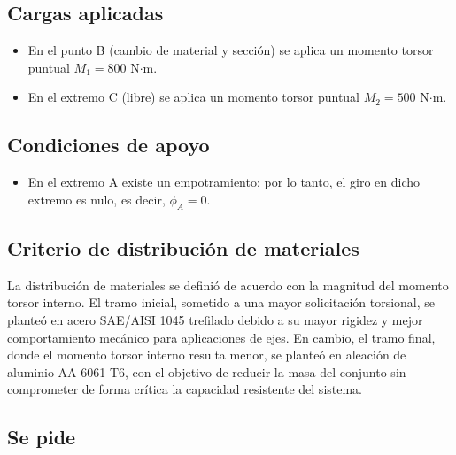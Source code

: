 \documentclass[12pt,a4paper]{article}
\begin{document}
\subsection*{Cargas aplicadas}

\begin{itemize}
    \item En el punto B (cambio de material y sección) se aplica un momento torsor puntual $M_1 = 800$ N$\cdot$m.
    \item En el extremo C (libre) se aplica un momento torsor puntual $M_2 = 500$ N$\cdot$m.
\end{itemize}

\subsection*{Condiciones de apoyo}

\begin{itemize}
    \item En el extremo A existe un empotramiento; por lo tanto, el giro en dicho extremo es nulo, es decir, $\phi_A = 0$.
\end{itemize}

\subsection*{Criterio de distribución de materiales}

La distribución de materiales se definió de acuerdo con la magnitud del momento torsor interno. El tramo inicial, sometido a una mayor solicitación torsional, se planteó en acero SAE/AISI 1045 trefilado debido a su mayor rigidez y mejor comportamiento mecánico para aplicaciones de ejes. En cambio, el tramo final, donde el momento torsor interno resulta menor, se planteó en aleación de aluminio AA 6061-T6, con el objetivo de reducir la masa del conjunto sin comprometer de forma crítica la capacidad resistente del sistema.


\subsection*{Se pide}
\end{document}
